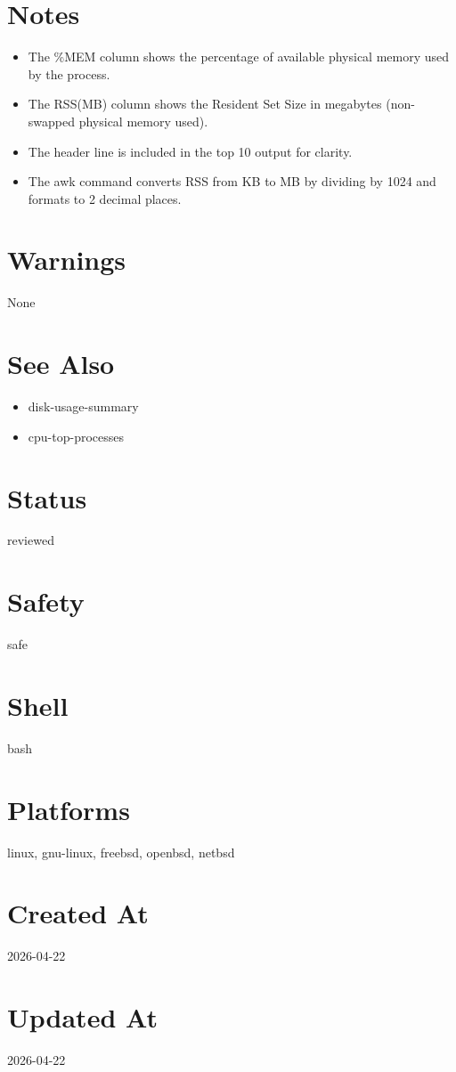 \documentclass{article}
\begin{document}
\section*{Notes}
\begin{itemize}
  \item The \%MEM column shows the percentage of available physical memory used by the process.
  \item The RSS(MB) column shows the Resident Set Size in megabytes (non-swapped physical memory used).
  \item The header line is included in the top 10 output for clarity.
  \item The awk command converts RSS from KB to MB by dividing by 1024 and formats to 2 decimal places.
\end{itemize}

\section*{Warnings}
None

\section*{See Also}
\begin{itemize}
  \item disk-usage-summary
  \item cpu-top-processes
\end{itemize}

\section*{Status}
reviewed

\section*{Safety}
safe

\section*{Shell}
bash

\section*{Platforms}
linux, gnu-linux, freebsd, openbsd, netbsd

\section*{Created At}
2026-04-22

\section*{Updated At}
2026-04-22
\end{document}
